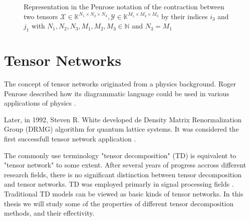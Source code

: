 \documentclass[11pt,a4paper,openright,oneside]{book}
\numberwithin{equation}{section}
\begin{document}
\begin{figure}
\centering
{}
\caption{
    Representation in the Penrose notation of the contraction between two tensors $\mathcal{X} \in \mathbb{K}^{N_1 \times N_2 \times N_3}, \mathcal{Y} \in \mathbb{K}^{M_1 \times M_2 \times M_3}$
    by their indices $i_3$ and $j_1$ with $N_1, N_2, N_3, M_1, M_2, M_3 \in \mathbb{N}$ and $N_3 = M_1$
}
\label{pen:tencon}
\end{figure}



















\chapter{Tensor Networks}

The concept of tensor networks originated from a physics background. Roger Penrose described how its
diagrammatic language could be used in various applications of physics \cite{rogerPenroseApplications}.

Later, in 1992, Steven R. White developed de Density Matrix Renormalization Group (DRMG) algorithm for
quantum lattice systems. It was considered the first successfull tensor network application \cite{whiteDensityMatrixFormulation1992}.

The commonly use terminology "tensor decomposition" (TD) is equivalent to "tensor network" to some extent. After
several years of progress accross different research fields, there is no significant distinction between tensor decomposition
and tensor networks. TD was employed primarly in signal processing fields \cite{wangTensorNetworksMeet2023}. Traditional TD models can be viewed
as basic kinds of tensor networks. In this thesis we will study some of the properties of different tensor decomposition methods,
and their effectivity.
\end{document}
